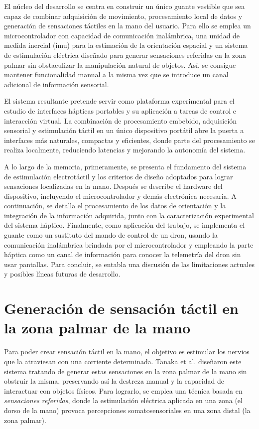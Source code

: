 \documentclass[12pt]{article}
\begin{document}
El núcleo del desarrollo se centra en construir un único guante vestible que sea capaz de combinar adquisición de movimiento, procesamiento local de datos y generación de sensaciones táctiles en la mano del usuario. Para ello se emplea un microcontrolador con capacidad de comunicación inalámbrica, una unidad de medida inercial (\gls{imu}) para la estimación de la orientación espacial y un sistema de estimulación eléctrica diseñado para generar sensaciones referidas en la zona palmar sin obstaculizar la manipulación natural de objetos. Así, se consigue mantener funcionalidad manual a la misma vez que se introduce un canal adicional de información sensorial.

El sistema resultante pretende servir como plataforma experimental para el estudio de interfaces hápticas portables y su aplicación a tareas de control e interacción virtual. La combinación de procesamiento embebido, adquisición sensorial y estimulación táctil en un único dispositivo portátil abre la puerta a interfaces más naturales, compactas y eficientes, donde parte del procesamiento se realiza localmente, reduciendo latencias y mejorando la autonomía del sistema.

A lo largo de la memoria, primeramente, se presenta el fundamento del sistema de estimulación electrotáctil y los criterios de diseño adoptados para lograr sensaciones localizadas en la mano. Después se describe el hardware del dispositivo, incluyendo el microcontrolador y demás electrónica necesaria. A continuación, se detalla el procesamiento de los datos de orientación y la integración de la información adquirida, junto con la caracterización experimental del sistema háptico. Finalmente, como aplicación del trabajo, se implementa el guante como un sustituto del mando de control de un dron, usando la comunicación inalámbrica brindada por el microcontrolador y empleando la parte háptica como un canal de información para conocer la telemetría del dron sin usar pantallas. Para concluir, se entabla una discusión de las limitaciones actuales y posibles líneas futuras de desarrollo.


\section{Generación de sensación táctil en la zona palmar de la mano}

Para poder crear sensación táctil en la mano, el objetivo es estimular los nervios que la atraviesan con una corriente determinada. Tanaka et al. \cite{Tanaka2023} diseñaron este sistema tratando de generar estas sensaciones en la zona palmar de la mano sin obstruir la misma, preservando así la destreza manual y la capacidad de interactuar con objetos físicos. Para lograrlo, se emplea una técnica basada en \textit{sensaciones referidas}, donde la estimulación eléctrica aplicada en una zona (el dorso de la mano) provoca percepciones somatosensoriales en una zona distal (la zona palmar).
\end{document}
